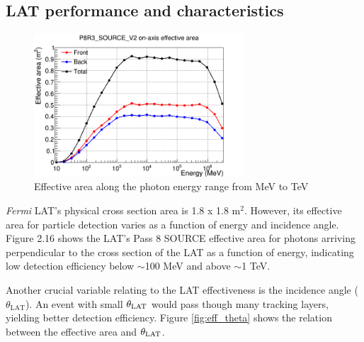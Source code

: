 \subsection{LAT performance and characteristics}

\begin{figure}[h!]
    \centering
    \includegraphics[width=0.7\textwidth]{content/background/figures/eff_energy.png}
    \caption{
        Effective area along the photon energy range from MeV to TeV
        \citep{lat_p8_performance}
    }
    \label{fig:eff_energy}
\end{figure}

\textit{Fermi} LAT's physical cross section area is 1.8 x 1.8 m$^2$.
However, its effective area for particle detection varies as a
function of energy and incidence angle. Figure 2.16 shows the
LAT's Pass 8 SOURCE effective area for photons arriving
perpendicular to the cross section of the LAT as a function
of energy, indicating low detection efficiency below $\sim$100 MeV
and above $\sim$1 TeV.


Another crucial variable relating to the LAT effectiveness
is the incidence angle ($\theta_\text{LAT}$).
An event with small $\theta_{\rm LAT}$ would pass though many
tracking layers, yielding better detection efficiency.
Figure \ref{fig:eff_theta} shows
the relation between the effective area and $\theta_{\rm LAT}$.


